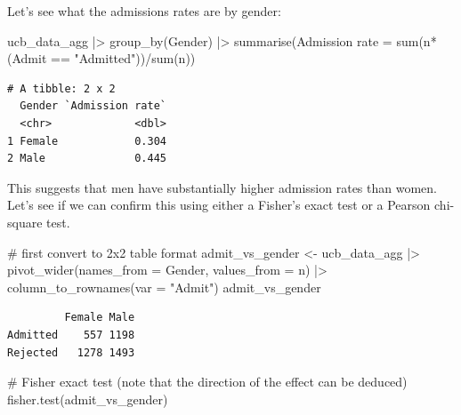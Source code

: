 \documentclass[
  11pt,
  letterpaper,
  oneside]{book}
\newenvironment{Shaded}{\begin{snugshade}}{\end{snugshade}}
\newcommand{\AttributeTok}[1]{\textcolor[rgb]{0.40,0.45,0.13}{#1}}
\newcommand{\CommentTok}[1]{\textcolor[rgb]{0.37,0.37,0.37}{#1}}
\newcommand{\FunctionTok}[1]{\textcolor[rgb]{0.28,0.35,0.67}{#1}}
\newcommand{\NormalTok}[1]{\textcolor[rgb]{0.00,0.23,0.31}{#1}}
\newcommand{\OtherTok}[1]{\textcolor[rgb]{0.00,0.23,0.31}{#1}}
\newcommand{\SpecialCharTok}[1]{\textcolor[rgb]{0.37,0.37,0.37}{#1}}
\newcommand{\StringTok}[1]{\textcolor[rgb]{0.13,0.47,0.30}{#1}}
\theoremstyle{plain}
\theoremstyle{plain}
\theoremstyle{definition}
\theoremstyle{definition}
\theoremstyle{plain}
\theoremstyle{remark}
\begin{document}
Let's see what the admissions rates are by gender:

\begin{Shaded}
\begin{Highlighting}[]
\NormalTok{ucb\_data\_agg }\SpecialCharTok{|\textgreater{}}
  \FunctionTok{group\_by}\NormalTok{(Gender) }\SpecialCharTok{|\textgreater{}}
  \FunctionTok{summarise}\NormalTok{(}\StringTok{\textasciigrave{}}\AttributeTok{Admission rate}\StringTok{\textasciigrave{}} \OtherTok{=} \FunctionTok{sum}\NormalTok{(n}\SpecialCharTok{*}\NormalTok{(Admit }\SpecialCharTok{==} \StringTok{"Admitted"}\NormalTok{))}\SpecialCharTok{/}\FunctionTok{sum}\NormalTok{(n))}
\end{Highlighting}
\end{Shaded}

\begin{verbatim}
# A tibble: 2 x 2
  Gender `Admission rate`
  <chr>             <dbl>
1 Female            0.304
2 Male              0.445
\end{verbatim}

This suggests that men have substantially higher admission rates than
women. Let's see if we can confirm this using either a Fisher's exact
test or a Pearson chi-square test.

\begin{Shaded}
\begin{Highlighting}[]
\CommentTok{\# first convert to 2x2 table format}
\NormalTok{admit\_vs\_gender }\OtherTok{\textless{}{-}}\NormalTok{ ucb\_data\_agg }\SpecialCharTok{|\textgreater{}}
  \FunctionTok{pivot\_wider}\NormalTok{(}\AttributeTok{names\_from =}\NormalTok{ Gender, }\AttributeTok{values\_from =}\NormalTok{ n) }\SpecialCharTok{|\textgreater{}}
  \FunctionTok{column\_to\_rownames}\NormalTok{(}\AttributeTok{var =} \StringTok{"Admit"}\NormalTok{)}
\NormalTok{admit\_vs\_gender}
\end{Highlighting}
\end{Shaded}

\begin{verbatim}
         Female Male
Admitted    557 1198
Rejected   1278 1493
\end{verbatim}

\begin{Shaded}
\begin{Highlighting}[]
\CommentTok{\# Fisher exact test (note that the direction of the effect can be deduced)}
\FunctionTok{fisher.test}\NormalTok{(admit\_vs\_gender)}
\end{Highlighting}
\end{Shaded}
\end{document}
